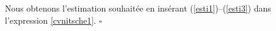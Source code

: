 \documentclass[11pt]{book}
\newtheorem{corollary}[theorem]{Corollaire}
\newcommand{\bc}{\begin{corollary}}
\newcommand{\ec}{\end{corollary}}
\newcommand{\pf}{\textbf{Preuve : }}
\newcommand{\cqfd}{{$\mbox{}$\hfill$\square$}}
\def\u{{\bf u}}
\newcommand{\caI}{{\cal I}}
\newcommand{\sn}{{\sigma_n}}
\newcommand{\Pgh}{P_{\gamma}}
\begin{document}
Nous obtenons l'estimation souhaitée en insérant (\ref{esti1})--(\ref{esti3}) dans l'expression \eqref{cvnitsche1}.
\cqfd
% 
% 
% 
% 
% 
% 
\end{document}

